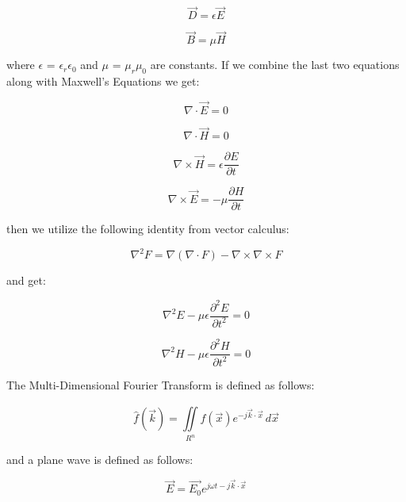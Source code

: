 \documentclass[12pt]{article}
\begin{document}
\begin{equation}
	\vec{D} = \epsilon\vec{E}
\end{equation}

\begin{equation}
	\vec{B} = \mu\vec{H}
\end{equation}

where \(\epsilon\) = \(\epsilon_{r}\)\(\epsilon_{0}\) and \(\mu\) = \(\mu_{r}\)\(\mu_{0}\) are constants. If we combine the last two equations along with Maxwell's Equations we get:

\begin{equation}
	\nabla \cdot \vec{E} = 0
\end{equation}

\begin{equation}
	\nabla \cdot \vec{H} = 0
\end{equation}

\begin{equation}
	\nabla \times \vec{H} = \epsilon\frac{\partial E}{\partial t}
\end{equation}

\begin{equation}
	\nabla \times \vec{E} = -\mu\frac{\partial H}{\partial t}
\end{equation}

then we utilize the following identity from vector calculus:

\begin{equation}
	\nabla^2F = \nabla(\nabla \cdot F) - \nabla\times\nabla\times F
\end{equation}

and get:

\begin{equation}
	\nabla^2E - \mu\epsilon\frac{\partial^2 E}{\partial t^2} = 0
\end{equation}

\begin{equation}
	\nabla^2H - \mu\epsilon\frac{\partial^2 H}{\partial t^2} = 0
\end{equation}

The Multi-Dimensional Fourier Transform is defined as follows:

\begin{equation}
	\hat{f} (\vec{k}) = \iint \limits_{R^n}^{} f(\vec{x})e^{-j \vec{k} \cdot \vec{x}} \,d\vec{x}
\end{equation}

and a plane wave is defined as follows:

\begin{equation}
	\vec{E} = \vec{E_{0}}e^{j \omega t - j\vec{k} \cdot \vec{x}} 
\end{equation}
\end{document}
